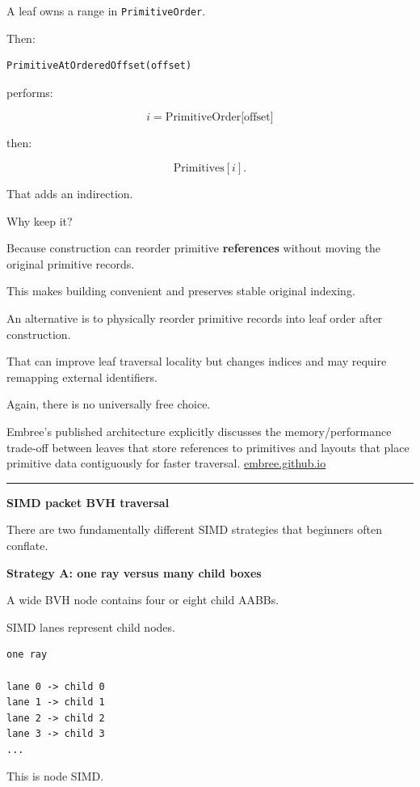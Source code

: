 A leaf owns a range in \texttt{PrimitiveOrder}.

Then:

\begin{verbatim}
PrimitiveAtOrderedOffset(offset)
\end{verbatim}

performs:

\[
i=\text{PrimitiveOrder[offset]}
\]

then:

\[
\text{Primitives}[i].
\]

That adds an indirection.

Why keep it?

Because construction can reorder primitive \textbf{references} without moving the original primitive records.

This makes building convenient and preserves stable original indexing.

An alternative is to physically reorder primitive records into leaf order after construction.

That can improve leaf traversal locality but changes indices and may require remapping external identifiers.

Again, there is no universally free choice.

Embree's published architecture explicitly discusses the memory/performance trade-off between leaves that store references to primitives and layouts that place primitive data contiguously for faster traversal. \href{https://embree.github.io/papers/2014-Siggraph-Embree.pdf?utm_source=chatgpt.com}{embree.github.io}

\begin{center}\rule{0.5\linewidth}{0.5pt}\end{center}

\textbf{SIMD packet BVH traversal}

There are two fundamentally different SIMD strategies that beginners often conflate.

\textbf{Strategy A: one ray versus many child boxes}

A wide BVH node contains four or eight child AABBs.

SIMD lanes represent child nodes.

\begin{verbatim}
one ray

lane 0 -> child 0
lane 1 -> child 1
lane 2 -> child 2
lane 3 -> child 3
...
\end{verbatim}

This is node SIMD.

